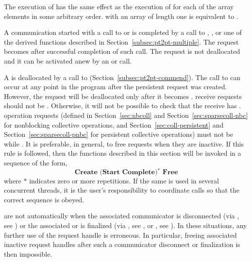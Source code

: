 The execution of
has the same effect as the execution of
for each of the array elements
in some arbitrary order.
 with an array of length one
is equivalent to .

A communication started with a call to  or
 is
completed by a call to , , or
one of the derived functions described in
Section~\ref{subsec:pt2pt-multiple}.  The request becomes  after
successful completion of such call.  The request is not deallocated
and it can be activated anew by an  or
 call.

A  is deallocated by a call to
(Section~\ref{subsec:pt2pt-commend}).
%
The call to  can occur at any point in the program
after the persistent request was created.  However, the request will be
deallocated only after it becomes .
 receive requests should not be . Otherwise, it will not be
possible to check that the receive has .
 operation requests
(defined in
Section~\ref{sec:nbcoll} and Section~\ref{sec:sparsecoll-nbc}
for nonblocking collective operations, and
Section~\ref{sec:coll-persistent} and Section~\ref{sec:sparsecoll-pnbc}
for persistent collective operations)
must not be  while .
It is preferable, in general, to free requests when they are inactive.  If this
rule is followed, then the functions
described in this section will be invoked
in a sequence of the form,
\[
\textbf{Create \ (Start \ Complete)$^*$ \ Free}
\]
where
$*$ indicates zero or more repetitions.
If the same  is used in several concurrent
threads, it is the user's responsibility to coordinate calls so that the
correct sequence is obeyed.

 are not automatically 
when the associated communicator is disconnected (via , see )
or the associated \wpm{} or \spm{} is finalized (via , see , or , see ).
In these situations, any further use of the request handle is erroneous.
In particular, freeing associated inactive request handles after such a communicator disconnect or finalization is then impossible.

